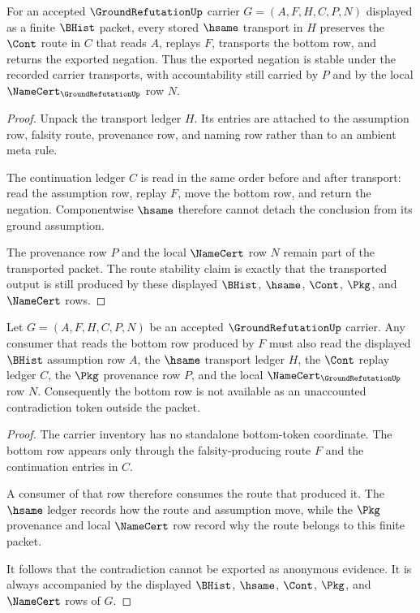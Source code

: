 \begin{theorem}
\label{thm:ground-refutation-route-stability}
For an accepted $\GroundRefutationUp$ carrier $G=(A,F,H,C,P,N)$ displayed as a finite $\BHist$ packet, every stored $\hsame$ transport in $H$ preserves the $\Cont$ route in $C$ that reads $A$, replays $F$, transports the bottom row, and returns the exported negation. Thus the exported negation is stable under the recorded carrier transports, with accountability still carried by $P$ and by the local $\NameCert_{\GroundRefutationUp}$ row $N$.
\end{theorem}
\begin{proof}
Unpack the transport ledger $H$. Its entries are attached to the assumption row, falsity route, provenance row, and naming row rather than to an ambient meta rule.

The continuation ledger $C$ is read in the same order before and after transport: read the assumption row, replay $F$, move the bottom row, and return the negation. Componentwise $\hsame$ therefore cannot detach the conclusion from its ground assumption.

The provenance row $P$ and the local $\NameCert$ row $N$ remain part of the transported packet. The route stability claim is exactly that the transported output is still produced by these displayed $\BHist$, $\hsame$, $\Cont$, $\Pkg$, and $\NameCert$ rows.
\end{proof}

\begin{theorem}
\label{thm:ground-refutation-ledger-accountability}
Let $G=(A,F,H,C,P,N)$ be an accepted $\GroundRefutationUp$ carrier. Any consumer that reads the bottom row produced by $F$ must also read the displayed $\BHist$ assumption row $A$, the $\hsame$ transport ledger $H$, the $\Cont$ replay ledger $C$, the $\Pkg$ provenance row $P$, and the local $\NameCert_{\GroundRefutationUp}$ row $N$. Consequently the bottom row is not available as an unaccounted contradiction token outside the packet.
\end{theorem}
\begin{proof}
The carrier inventory has no standalone bottom-token coordinate. The bottom row appears only through the falsity-producing route $F$ and the continuation entries in $C$.

A consumer of that row therefore consumes the route that produced it. The $\hsame$ ledger records how the route and assumption move, while the $\Pkg$ provenance and local $\NameCert$ row record why the route belongs to this finite packet.

It follows that the contradiction cannot be exported as anonymous evidence. It is always accompanied by the displayed $\BHist$, $\hsame$, $\Cont$, $\Pkg$, and $\NameCert$ rows of $G$.
\end{proof}

